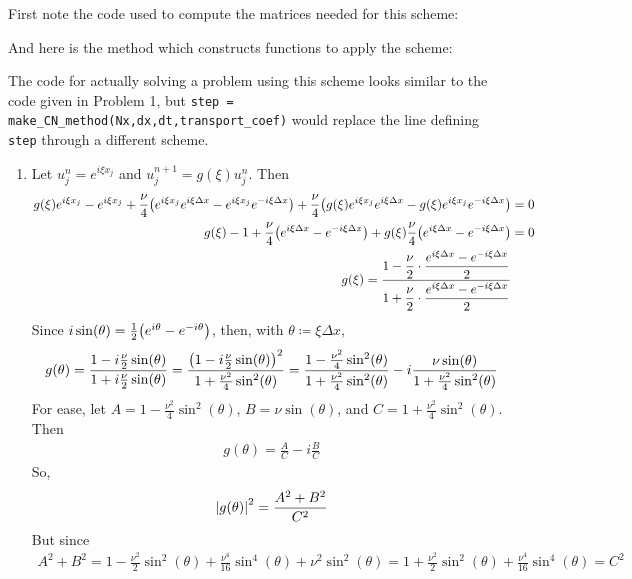 \documentclass{article} %
\theoremstyle{plain}
\newcommand{\Dx}{\Delta x}
\numberwithin{equation}{section} %
\numberwithin{figure}{section} %
\numberwithin{table}{section} %
\begin{document}
First note the code used to compute the matrices needed for this scheme:

And here is the method which constructs functions to apply the scheme:

The code for actually solving a problem using this scheme looks similar to the code given in Problem 1, but \verb|step = make_CN_method(Nx,dx,dt,transport_coef)| would replace the line defining \verb|step| through a different scheme.

\begin{enumerate}[\ \ (a)]
    \item
        Let $u_j^n = e^{i\xi x_j}$ and $u_j^{n+1} = g(\xi)u_j^n$.  Then
        \begin{align*}
            g(\xi)e^{i\xi x_j} - e^{i\xi x_j} + \frac{\nu}{4}\qty(e^{i\xi x_j}e^{i\xi\Dx} - e^{i\xi x_j}e^{-i\xi\Dx}) + \frac{\nu}{4}\qty(g(\xi)e^{i\xi x_j}e^{i\xi\Dx} - g(\xi)e^{i\xi x_j}e^{-i\xi\Dx}) &= 0 \\
            g(\xi) - 1 + \frac{\nu}{4}\qty(e^{i\xi\Dx} - e^{-i\xi\Dx}) + g(\xi)\frac{\nu}{4}\qty(e^{i\xi\Dx} - e^{-i\xi\Dx}) &= 0 \\
            g(\xi) = \frac{1 - \dfrac{\nu}{2}\cdot\dfrac{e^{i\xi\Dx} - e^{-i\xi\Dx}}{2}}{1 + \dfrac{\nu}{2}\cdot\dfrac{e^{i\xi\Dx} - e^{-i\xi\Dx}}{2}}&
        \end{align*}
        Since $i\sin(\theta) = \frac{1}{2}\qty(e^{i\theta} - e^{-i\theta})$, then, with $\theta \coloneqq \xi\Dx$,
        \begin{align*}
            g(\theta) = \frac{1 - i\frac{\nu}{2}\sin(\theta)}{1 + i\frac{\nu}{2}\sin(\theta)} = \frac{\qty(1 - i\frac{\nu}{2}\sin(\theta))^2}{1 + \frac{\nu^2}{4}\sin^2(\theta)} = \frac{1 - \frac{\nu^2}{4}\sin^2(\theta)}{1 + \frac{\nu^2}{4}\sin^2(\theta)} - i\frac{\nu\sin(\theta)}{1 + \frac{\nu^2}{4}\sin^2(\theta)}
        \end{align*}
        For ease, let $A = 1 - \frac{\nu^2}{4}\sin^2(\theta)$, $B = \nu\sin(\theta)$, and $C = 1 + \frac{\nu^2}{4}\sin^2(\theta)$.  Then
        \begin{align*}
            g(\theta) = \frac{A}{C} - i\frac{B}{C}
        \end{align*}
        So,
        \begin{align*}
            \abs{g(\theta)}^2 = \frac{A^2 + B^2}{C^2}
        \end{align*}
        But since
        \begin{align*}
            A^2 + B^2 = 1 - \frac{\nu^2}{2}\sin^2(\theta) + \frac{\nu^4}{16}\sin^4(\theta) + \nu^2\sin^2(\theta) = 1 + \frac{\nu^2}{2}\sin^2(\theta) + \frac{\nu^4}{16}\sin^4(\theta) = C^2

\end{align*}
\end{enumerate}
\end{document}
